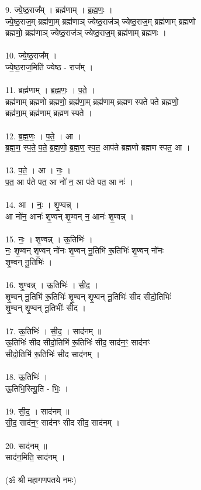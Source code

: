 9. ज्ये॒ष्ठ॒राज᳚म् । ब्रह्म॑णाम् । ब्र॒ह्म॒णः॒ ।\\
ज्ये॒ष्ठ॒राज॒म् ब्रह्म॑णा॒म् ब्रह्म॑णाञ् ज्येष्ठ॒राज॑ञ् ज्येष्ठ॒राज॒म् ब्रह्म॑णाम् ब्रह्मणो\\
ब्रह्मणो॒ ब्रह्म॑णाञ् ज्येष्ठ॒राज॑ञ् ज्येष्ठ॒राज॒म् ब्रह्म॑णाम् ब्रह्मणः ।\\
\\
10. ज्ये॒ष्ठ॒राज᳚म् ।\\
ज्ये॒ष्ठ॒राज॒मिति॑ ज्येष्ठ - राज᳚म् ।\\
\\
11. ब्रह्म॑णाम् । ब्र॒ह्म॒णः॒ । प॒ते॒ ।\\
ब्रह्म॑णाम् ब्रह्मणो ब्रह्मणो॒ ब्रह्म॑णा॒म् ब्रह्म॑णाम् ब्रह्मण स्पते पते ब्रह्मणो॒\\
ब्रह्म॑णा॒म् ब्रह्म॑णाम् ब्रह्मण स्पते ।\\
\\
12. ब्र॒ह्म॒णः॒ । प॒ते॒ । आ ।\\
ब्र॒ह्म॒ण॒ स्प॒ते॒ प॒ते॒ ब्र॒ह्म॒णो॒ ब्र॒ह्म॒ण॒ स्प॒त॒ आप॑ते ब्रह्मणो ब्रह्मण स्पत॒ आ ।\\
\\
13. प॒ते॒ । आ । नः॒ ।\\
प॒त॒ आ प॑ते पत॒ आ नो॑ न॒ आ प॑ते पत॒ आ नः॑ ।\\
\\
14. आ । नः॒ । शृ॒ण्वन्न् ।\\
आ नो॑न॒ आनः॑ शृ॒ण्वन् शृ॒ण्वन् न॒ आनः॑ शृ॒ण्वन्न् ।\\
\\
15. नः॒ । शृ॒ण्वन्न् । ऊ॒तिभिः॑ ।\\
नः॒ शृ॒ण्वन् शृ॒ण्वन् नो॑नः शृ॒ण्वन् नू॒तिभि॑ रू॒तिभिः॑ शृ॒ण्वन् नो॑नः\\
शृ॒ण्वन् नू॒तिभिः॑ ।\\
\\
16. शृ॒ण्वन्न् । ऊ॒तिभिः॑ । सी॒द॒ ।\\
शृ॒ण्वन् नू॒तिभि॑ रू॒तिभिः॑ शृ॒ण्वन् शृ॒ण्वन् नू॒तिभिः॑ सीद सीदो॒तिभिः॑\\
शृ॒ण्वन् शृ॒ण्वन् नू॒तिभीः॑ सीद ।\\
\\
17. ऊ॒तिभिः॑ । सी॒द॒ । साद॑नम् ॥\\
ऊ॒तिभिः॑ सीद सीदो॒तिभि॑ रू॒तिभिः॑ सीद॒ साद॑न॒ꣳ॒ साद॑नꣳ\\
सीदो॒तिभि॑ रू॒तिभिः॑ सीद साद॑नम् ।\\
\\
18. ऊ॒तिभिः॑ ।\\
ऊ॒तिभि॒रित्यू॒ति - भिः॒ ।\\
\\
19. सी॒द॒ । साद॑नम् ॥\\
सी॒द॒ साद॑न॒ꣳ॒ साद॑नꣳ सीद सीद॒ साद॑नम् ।\\
\\
20. साद॑नम् ॥\\
साद॑न॒मिति॒ साद॑नम् ।\\
\\
(ॐ श्री महागणपतये नमः)\\
